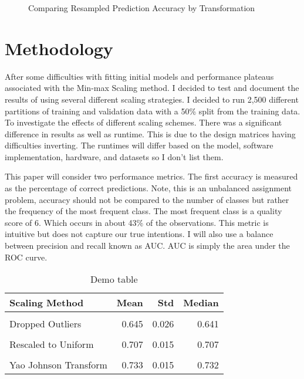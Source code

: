 \documentclass[16pt,twocolumn,letterpaper,titlepage]{article}
\begin{document}
\begin{figure}[!htb]
	\caption{\label{fig:my-label} Comparing Resampled Prediction Accuracy by Transformation}
\end{figure}

\section{Methodology}
After some difficulties with fitting initial models and performance plateaus associated with the Min-max Scaling method. I decided to test and document the results of using several different scaling strategies. I decided to run 2,500 different partitions of training and validation data with a 50\% split from the training data. To investigate the effects of different scaling schemes. There was a significant difference in results as well as runtime. This is due to the design matrices having difficulties inverting. The runtimes will differ based on the model, software implementation, hardware, and datasets so I don't list them.  

This paper will consider two performance metrics. The first accuracy is measured as the percentage of correct predictions. Note, this is an unbalanced assignment problem, accuracy should not be compared to the number of classes but rather the frequency of the most frequent class. The most frequent class is a quality score of 6. Which occurs in about 43\% of the observations. This metric is intuitive but does not capture our true intentions. I will also use a balance between precision and recall known as AUC. AUC is simply the area under the ROC curve.
\begin{table}[!h]

\caption{Demo table}
\centering
\begin{tabular}[t]{lrrr}
\toprule
Scaling Method & Mean & Std & Median\\
\midrule
\cellcolor{gray!6}{No Transformation} & \cellcolor{gray!6}{0.590} & \cellcolor{gray!6}{0.024} & \cellcolor{gray!6}{0.592}\\
Dropped Outliers & 0.645 & 0.026 & 0.641\\
\cellcolor{gray!6}{Min Max Scale} & \cellcolor{gray!6}{0.690} & \cellcolor{gray!6}{0.018} & \cellcolor{gray!6}{0.691}\\
Rescaled to Uniform & 0.707 & 0.015 & 0.707\\
\cellcolor{gray!6}{Standard Scale} & \cellcolor{gray!6}{0.726} & \cellcolor{gray!6}{0.017} & \cellcolor{gray!6}{0.725}\\
\addlinespace
Yao Johnson Transform & 0.733 & 0.015 & 0.732\\
\bottomrule
\end{tabular}
\end{table}
\end{document}
